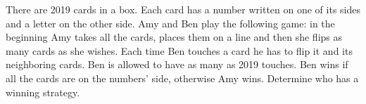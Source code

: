 There are 2019 cards in a box. Each card has a number written on one of its sides and a letter on the other side. Amy and Ben play the following game: in the beginning Amy takes all the cards, places them on a line and then she flips as many cards as she wishes. Each time Ben touches a card he has to flip it and its neighboring cards. Ben is allowed to have as many as 2019 touches. Ben wins if all the cards are on the numbers' side, otherwise Amy wins. Determine who has a winning strategy.